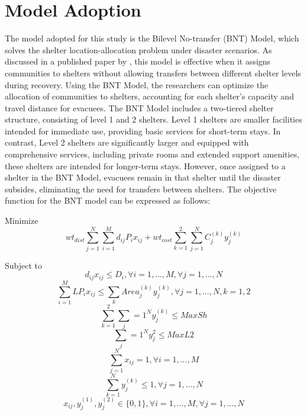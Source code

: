 \section{Model Adoption}
	The model adopted for this study is the Bilevel No-transfer (BNT) Model, which solves the shelter location-allocation problem under disaster scenarios. As discussed in a published paper by \textcite{LeahUP}, this model is effective when it assigns communities to shelters without allowing transfers between different shelter levels during recovery. Using the BNT Model, the researchers can optimize the allocation of communities to shelters, accounting for each shelter’s capacity and travel distance for evacuees.
	The BNT Model includes a two-tiered shelter structure, consisting of level 1 and 2 shelters. Level 1 shelters are smaller facilities intended for immediate use, providing basic services for short-term stays. In contrast, Level 2 shelters are significantly larger and equipped with comprehensive services, including private rooms and extended support amenities, these shelters are intended for longer-term stays. However, once assigned to a shelter in the BNT Model, evacuees remain in that shelter until the disaster subsides, eliminating the need for transfers between shelters.
	The objective function for the BNT model can be expressed as follows:
	
	Minimize 
	\begin{equation} 					  		wt_{dist}\sum_{j=1}^{N}\sum_{i=1}^{M}d_{ij}P_{i}x_{ij}+wt_{cost}\sum_{k=1}^{2}\sum_{j=1}^{N}C_{j}^{(k)}y_{j}^{(k)} \end{equation}
	
	Subject to
	\begin{equation} 	
		\label{c1}
		d_{ij}x_{ij} \le D_{i}, \forall i = 1,..., M,  \forall j = 1,..., N 
	\end{equation}
	\begin{equation} 
		\label{c2}
		\sum_{i=1}^{M}LP_{i}x_{ij} \le \sum_{k} Area_{j}^{(k)} y_{j}^{(k)}, \forall j = 1,..., N , k=1,2
	\end{equation}
	\begin{equation} 
		\label{c3}
		\sum_{k=1}^{2} \sum_j={1}^{N}y_{j}^{(k)} \le MaxSh
	\end{equation}
	\begin{equation}
		\label{c4} 
		\sum_j={1}^{N}y_{j}^2 \le MaxL2
	\end{equation}
	\begin{equation}
		\label{c5}
		\sum_{j=1}^{N}x_{ij} = 1, \forall i=1,...,M
	\end{equation}
	\begin{equation}
		\label{c6}
		\sum_{k=1}^{N}y_{j}^{(k)} \le 1, \forall j=1,...,N
	\end{equation}
	\begin{equation}
		\label{c7}
	 	x_{ij}, y_{j}^{(1)},y_{j}^{(2)} \in \{0,1\}, \forall i=1,...,M,  \forall j=1,...,N
	\end{equation}
	
